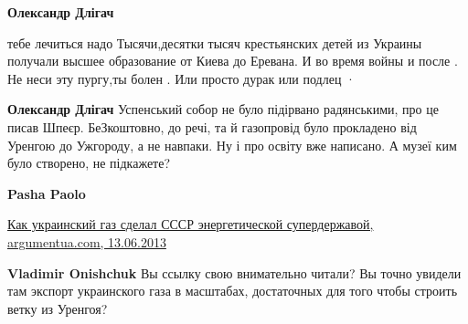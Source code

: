 \begin{itemize}
\begin{itemize}
\begin{itemize}
 
\textbf{Олександр Длігач} 

тебе лечиться надо \Laughey[1.0][white] Тысячи,десятки тысяч крестьянских детей из Украины
получали высшее образование от Киева до Еревана. И во время войны и после . Не
неси эту пургу,ты болен . Или просто дурак или подлец · 


 
\textbf{Олександр Длігач} Успенський собор не було підірвано радянськими, про
це писав Шпеєр. БеЗкоштовно, до речі, та й газопровід було прокладено від
Уренгою до Ужгороду, а не навпаки. Ну і про освіту вже написано. А музеї ким
було створено, не підкажете?

 
\textbf{Pasha Paolo}

\href{http://argumentua.com/stati/kak-ukrainskii-gaz-sdelal-sssr-energeticheskoi-superderzhavoi}{%
Как украинский газ сделал СССР энергетической супердержавой, argumentua.com, 13.06.2013%
}

 
\textbf{Vladimir Onishchuk} Вы ссылку свою внимательно читали? Вы точно увидели
там экспорт украинского газа в масштабах, достаточных для того чтобы строить
ветку из Уренгоя?


 

\end{itemize}
\end{itemize}
\end{itemize}
